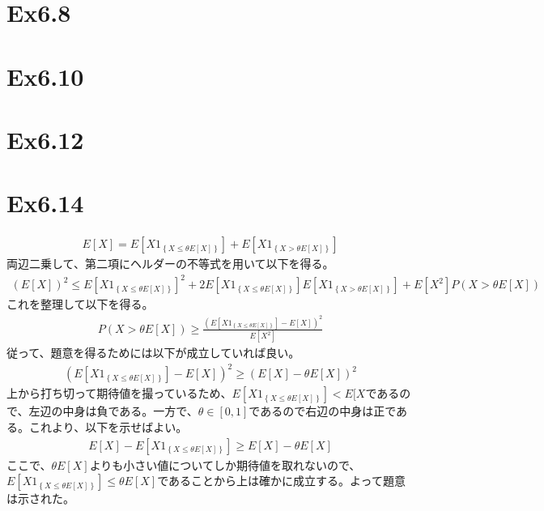 \documentclass{article}
\begin{document}
\section{Ex6.8}

\section{Ex6.10}

\section{Ex6.12}

\section{Ex6.14}
\begin{align*}
	E[X] = E\left[ X 1_{\left\{ X \leq \theta E[X] \right\}} \right] + E\left[ X 1_{\left\{ X > \theta E[X] \right\}} \right]
\end{align*}
両辺二乗して、第二項にヘルダーの不等式を用いて以下を得る。
\begin{align*}
	\left( E[X] \right)^2 \leq E\left[ X 1_{\left\{ X \leq \theta E[X] \right\}} \right]^2 + 2 E\left[ X 1_{\left\{ X \leq \theta E[X] \right\}} \right] E\left[ X 1_{\left\{ X > \theta E[X] \right\}} \right] + E[X^2] P\left( X > \theta E[X] \right)
\end{align*}
これを整理して以下を得る。
\begin{align*}
	P\left( X > \theta E[X] \right) \geq \frac{\left( E\left[ X 1_{\left\{ X \leq \theta E[X] \right\}} \right] - E[X] \right)^2}{E[X^2]}
\end{align*}
従って、題意を得るためには以下が成立していれば良い。
\begin{align*}
	\left( E\left[ X 1_{\left\{ X \leq \theta E[X] \right\}} \right] - E[X] \right)^2 \geq \left( E[X] - \theta E[X] \right)^2
\end{align*}
上から打ち切って期待値を撮っているため、$E\left[ X 1_{\left\{ X \leq \theta E[X] \right\}} \right] < E[X$であるので、左辺の中身は負である。一方で、$\theta \in [0,1]$であるので右辺の中身は正である。これより、以下を示せばよい。
\begin{align*}
	E[X] - E\left[ X 1_{\left\{ X \leq \theta E[X] \right\}} \right]  \geq E[X] - \theta E[X] 
\end{align*}
ここで、$\theta E[X]$よりも小さい値についてしか期待値を取れないので、$E\left[ X 1_{\left\{ X \leq \theta E[X] \right\}} \right] \leq \theta E[X]$であることから上は確かに成立する。よって題意は示された。
\end{document}
